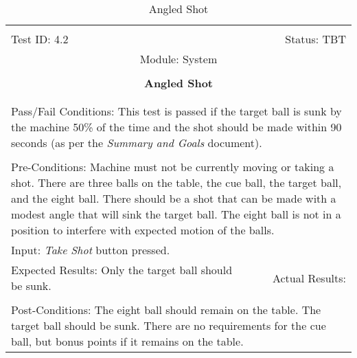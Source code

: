 \documentclass[titlepage]{article}
\begin{document}
\begin{center}%
\begin{table}
\begin{tabular}{|l r|}\hline&\\[-2mm]
	Test ID: 4.2	&Status: TBT\\[-3mm]
	\multicolumn{2}{|c|}{Module: System}\\&\\
	\multicolumn{2}{|c|}{\textbf{\large{Angled Shot}}}\\&\\\hline&\\[-3mm]
	\multicolumn{2}{|p{\textwidth}|}{Pass/Fail Conditions: This test is passed if the target ball is sunk by the machine 50\% of the time and the shot should be made within 90 seconds (as per the \textit{Summary and Goals} document).}\\[1mm]\hline&\\[-3mm]
	\multicolumn{2}{|p{\textwidth}|}{Pre-Conditions: Machine must not be currently moving or taking a shot. There are three balls on the table, the cue ball, the target ball, and the eight ball. There should be a shot that can be made with a modest angle that will sink the target ball. The eight ball is not in a position to interfere with expected motion of the balls.}\\[4mm]
	\multicolumn{2}{|p{\textwidth}|}{Input: \textit{Take Shot} button pressed.}\\[2mm]\hline
	\multicolumn{1}{|p{0.49\textwidth}}{Expected Results: Only the target ball should be sunk.}	&\multicolumn{1}{|p{0.45\textwidth}|}{Actual Results: }\\\hline&\\[-3mm]
	\multicolumn{2}{|p{\textwidth}|}{Post-Conditions: The eight ball should remain on the table. The target ball should be sunk. There are no requirements for the cue ball, but bonus points if it remains on the table.}\\\hline
\end{tabular}
\caption{Angled Shot}
\end{table}
\end{center}
\end{document}
